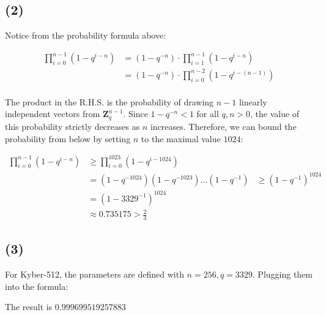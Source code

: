 \documentclass{article}
\begin{document}
\subsection*{(2)}
Notice from the probability formula above:

$$
\begin{aligned}
\prod_{i=0}^{n-1} (1 - q^{i-n})
&= (1-q^{-n}) \cdot \prod_{i=1}^{n-1}(1 - q^{i-n}) \\
&= (1-q^{-n}) \cdot \prod_{i=0}^{n-2}(1 - q^{i - (n - 1)}) \\
\end{aligned}
$$

The product in the R.H.S. is the probability of drawing $n-1$ linearly independent vectors from $\mathbf{Z}_q^{n-1}$. Since $1 - q^{-n} < 1$ for all $q, n > 0$, the value of this probability strictly decreases as $n$ increases. Therefore, we can bound the probability from below by setting $n$ to the maximal value $1024$:

$$
\begin{aligned}
\prod_{i=0}^{n-1} (1 - q^{i-n}) 
&\geq \prod_{i=0}^{1023} (1 - q^{i-1024}) \\
&= (1-q^{-1024})(1-q^{-1023}) \ldots (1-q^{-1})
&\geq (1 - q^{-1})^{1024} \\
&= (1 - 3329^{-1})^{1024} \\
&\approx 0.735175 > \frac{2}{3}
\end{aligned}
$$

\subsection*{(3)}
For Kyber-512, the parameters are defined with $n=256, q=3329$. Plugging them into the formula:



The result is $0.999699519257883$
\end{document}

